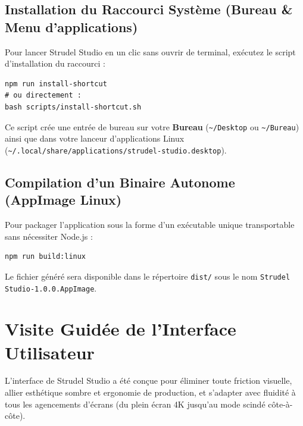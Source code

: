 \documentclass[a4paper,10pt]{article}
\begin{document}
\subsection{Installation du Raccourci Système (Bureau \& Menu d'applications)}
Pour lancer Strudel Studio en un clic sans ouvrir de terminal, exécutez le script d'installation du raccourci :
\begin{verbatim}
npm run install-shortcut
# ou directement :
bash scripts/install-shortcut.sh
\end{verbatim}
Ce script crée une entrée de bureau sur votre \textbf{Bureau} (\texttt{\textasciitilde/Desktop} ou \texttt{\textasciitilde/Bureau}) ainsi que dans votre lanceur d'applications Linux (\texttt{\textasciitilde/.local/share/applications/strudel-studio.desktop}).

\subsection{Compilation d'un Binaire Autonome (AppImage Linux)}
Pour packager l'application sous la forme d'un exécutable unique transportable sans nécessiter Node.js :
\begin{verbatim}
npm run build:linux
\end{verbatim}
Le fichier généré sera disponible dans le répertoire \texttt{dist/} sous le nom \texttt{Strudel Studio-1.0.0.AppImage}.

\newpage

\section{Visite Guidée de l'Interface Utilisateur}
L'interface de Strudel Studio a été conçue pour éliminer toute friction visuelle, allier esthétique sombre et ergonomie de production, et s'adapter avec fluidité à tous les agencements d'écrans (du plein écran 4K jusqu'au mode scindé côte-à-côte).
\end{document}
